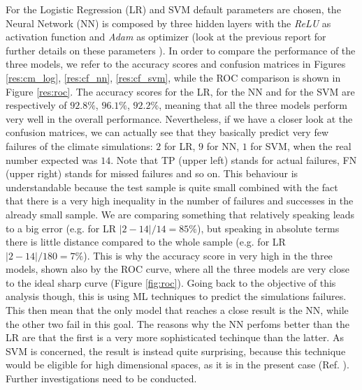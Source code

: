 \documentclass[english,notitlepage,reprint,nofootinbib]{revtex4-1}  %
\begin{document}
For the Logistic Regression (LR) and SVM default parameters are chosen, the Neural Network (NN) is composed by three hidden layers with the \textit{ReLU} as activation function and \textit{Adam} as optimizer (look at the previous report for further details on these parameters \cite{adele}). In order to compare the performance of the three models, we refer to the accuracy scores and confusion matrices in Figures \ref{res:cm_log}, \ref{res:cf_nn}, \ref{res:cf_svm}, while the ROC comparison is shown in Figure \ref{res:roc}. The accuracy scores for the LR, for the NN and for the SVM are respectively of $92.8\%$, $96.1\%$, $92.2\%$, meaning that all the three models perform very well in the overall performance. Nevertheless, if we have a closer look at the confusion matrices, we can actually see that they basically predict very few failures of the climate simulations: $2$ for LR, $9$ for NN, $1$ for SVM, when the real number expected was $14$. Note that TP (upper left) stands for actual failures, FN (upper right) stands for missed failures and so on. This behaviour is understandable because the test sample is quite small combined with the fact that there is a very high inequality in the number of failures and successes in the already small sample. We are comparing something that relatively speaking leads to a big error (e.g. for LR $|2-14|/14=85\%$), but speaking in absolute terms there is little distance compared to the whole sample (e.g. for LR $|2-14|/180=7\%$). This is why the accuracy score in very high in the three models, shown also by the ROC curve, where all the three models are very close to the ideal sharp curve (Figure \ref{fig:roc}). Going back to the objective of this analysis though, this is using ML techniques to predict the simulations failures. This then mean that the only model that reaches a close result is the NN, while the other two fail in this goal. The reasons why the NN perfoms better than the LR are that the first is a very more sophisticated techinque than the latter. As SVM is concerned, the result is instead quite surprising, because this technique would be eligible for high dimensional spaces, as it is in the present case (Ref. \cite{svm5}). Further investigations need to be conducted.
\end{document}
